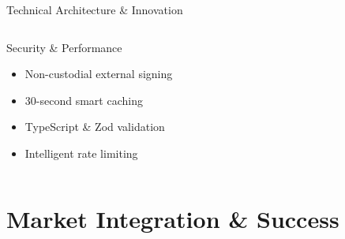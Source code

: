 \documentclass[aspectratio=169]{beamer}
\providecommand{\faSearchDollar}{\faDollarSign}
\begin{document}
\begin{frame}{Technical Architecture \& Innovation}
\begin{columns}
\begin{block}{Security \& Performance \hfill
{}}
\begin{itemize}
\item[\color{primary}\faCoins] Non-custodial external signing
\item[\color{primary}\faComments] 30-second smart caching
\item[\color{primary}\faSearchDollar] TypeScript \& Zod validation
\item[\color{primary}\faSync] Intelligent rate limiting
\end{itemize}
\end{block}
\end{columns}
\end{frame}

\section{Market Integration \& Success}
\end{document}
